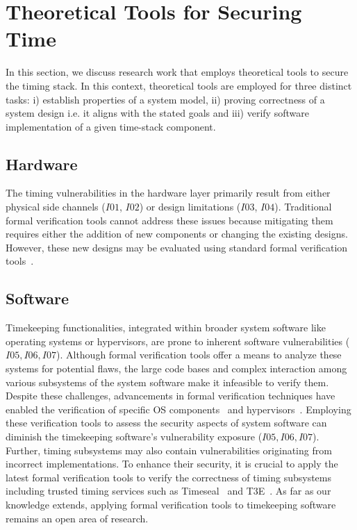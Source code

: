 \section{Theoretical Tools for Securing Time}
In this section, we discuss research work that employs theoretical tools to secure the timing stack. In this context, theoretical tools are employed for three distinct tasks: i) establish properties of a system model, ii) proving correctness of a system design i.e. it aligns with the stated goals and iii) verify software implementation of a given time-stack component. 

\subsection{Hardware}
The timing vulnerabilities in the hardware layer primarily result from either physical side channels ($I01$, $I02$) or design limitations ($I03$, $I04$).
Traditional formal verification tools cannot address these issues because mitigating them requires either the addition of new components or changing the existing designs. However, these new designs may be evaluated using standard formal verification tools~\cite{formal-verification-intel}.

\subsection{Software}
Timekeeping functionalities, integrated within broader system software like operating systems or hypervisors, are prone to inherent software vulnerabilities ($I05, I06, I07$). Although formal verification tools offer a means to analyze these systems for potential flaws, the large code bases and complex interaction among various subsystems of the system software make it infeasible to verify them. Despite these challenges, advancements in formal verification techniques have enabled the verification of specific OS components~\cite{formal-verification-eBPF} and hypervisors~\cite{formal-verification-hypervisor-arm, formal-verification-hypervisor-memory, formal-verification-kvm}. Employing these verification tools to assess the security aspects of system software can diminish the timekeeping software's vulnerability exposure ($I05, I06, I07$). Further, timing subsystems may also contain vulnerabilities originating from incorrect implementations. To enhance their security, it is crucial to apply the latest formal verification tools to verify the correctness of timing subsystems including trusted timing services such as Timeseal~\cite{time-stack-timeseal} and T3E~\cite{trusted-time-t3e}. As far as our knowledge extends, applying formal verification tools to timekeeping software remains an open area of research.

